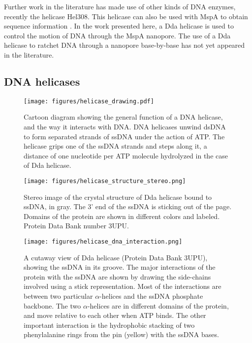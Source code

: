 Further work in the literature has made use of other kinds of DNA enzymes, recently the helicase Hel308.  This helicase can also be used with MspA to obtain sequence information \citep{Derrington2015}.  In the work presented here, a Dda helicase is used to control the motion of DNA through the MspA nanopore.  The use of a Dda helicase to ratchet DNA through a nanopore base-by-base has not yet appeared in the literature.

\subsection{DNA helicases}

\begin{figure}[h]
\begin{centering}
\texttt{[image: figures/helicase\_drawing.pdf]}
\caption[DNA helicase general function]{Cartoon diagram showing the general function of a DNA helicase, and the way it interacts with DNA.  DNA helicases unwind dsDNA to form separated strands of ssDNA under the action of ATP.  The helicase grips one of the ssDNA strands and steps along it, a distance of one nucleotide per ATP molecule hydrolyzed in the case of Dda helicase.}
\label{fig:helicase_drawing}
\end{centering}
\end{figure}

\begin{figure}[h]
\begin{centering}
\texttt{[image: figures/helicase\_structure\_stereo.png]}
\caption[Dda helicase structure]{Stereo image of the crystal structure of Dda helicase bound to ssDNA, in gray.  The 3' end of the ssDNA is sticking out of the page.  Domains of the protein are shown in different colors and labeled.  Protein Data Bank number 3UPU. \citep{He2012}}
\label{fig:helicase_stereo}
\end{centering}
\end{figure}

\begin{figure}[h]
\begin{centering}
\texttt{[image: figures/helicase\_dna\_interaction.png]}
\caption[Dda helicase: interactions with ssDNA]{A cutaway view of Dda helicase (Protein Data Bank 3UPU), showing the ssDNA in its groove.  The major interactions of the protein with the ssDNA are shown by drawing the side-chains involved using a stick representation.  Most of the interactions are between two particular $\alpha$-helices and the ssDNA phosphate backbone.  The two $\alpha$-helices are in different domains of the protein, and move relative to each other when ATP binds.  The other important interaction is the hydrophobic stacking of two phenylalanine rings from the pin (yellow) with the ssDNA bases.}
\label{fig:helicase_ssDNA_interactions}
\end{centering}
\end{figure}

